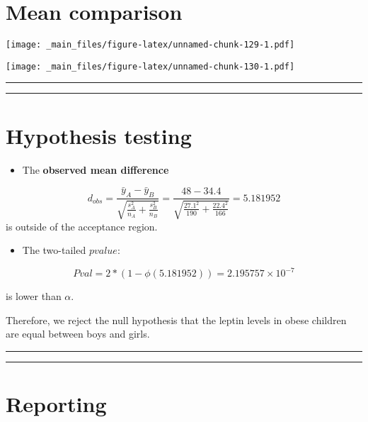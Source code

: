 \documentclass[
]{book}
\providecommand{\tightlist}{%
  \setlength{\itemsep}{0pt}\setlength{\parskip}{0pt}}
\begin{document}
\hypertarget{mean-comparison}{%
\section{Mean comparison}\label{mean-comparison}}

\texttt{[image: \_main\_files/figure-latex/unnamed-chunk-129-1.pdf]}

\texttt{[image: \_main\_files/figure-latex/unnamed-chunk-130-1.pdf]}

\begin{center}\rule{0.5\linewidth}{0.5pt}\end{center}

\begin{center}\rule{0.5\linewidth}{0.5pt}\end{center}

\hypertarget{hypothesis-testing-1}{%
\section{Hypothesis testing}\label{hypothesis-testing-1}}

\begin{itemize}
\tightlist
\item
  The \textbf{observed mean difference}
\end{itemize}

\[d_{obs}=\frac{\bar{y}_A-\bar{y}_B }{\sqrt{\frac{s^2_A}{n_A}+\frac{s^2_B}{n_B}}}=\frac{48-34.4}{\sqrt{\frac{27.1^2}{190}+\frac{22.4^2}{166}}}=5.181952\]
is outside of the acceptance region.

\begin{itemize}
\tightlist
\item
  The two-tailed \(pvalue\):
\end{itemize}

\[Pval=2*(1-\phi(5.181952))=2.195757 \times 10^{-7}\]

is lower than \(\alpha\).

Therefore, we reject the null hypothesis that the leptin levels in obese children are equal between boys and girls.

\begin{center}\rule{0.5\linewidth}{0.5pt}\end{center}

\begin{center}\rule{0.5\linewidth}{0.5pt}\end{center}

\hypertarget{reporting}{%
\section{Reporting}\label{reporting}}
\end{document}
